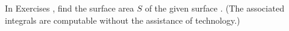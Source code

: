 {\noindent In Exercises}
{, find the surface area $S$ of the given surface \surfaceS. (The associated integrals are computable without the assistance of technology.)
}
